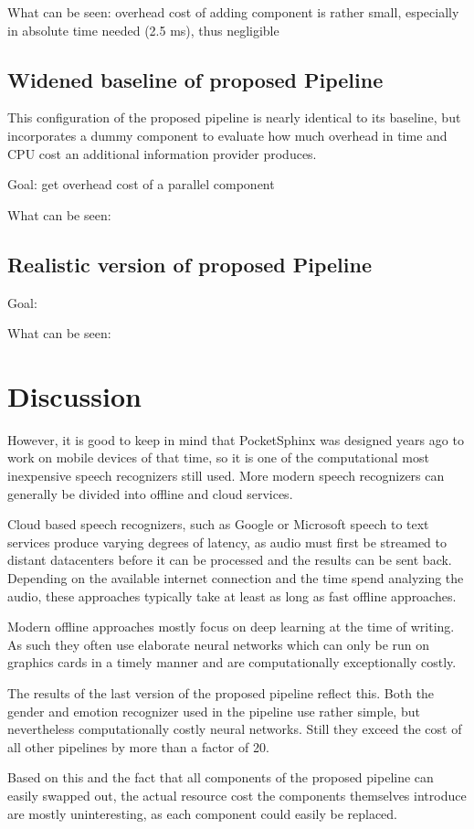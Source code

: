What can be seen: overhead cost of adding component is rather small, especially in absolute time needed (2.5 ms), thus negligible

\subsection{Widened baseline of proposed Pipeline}
This configuration of the proposed pipeline is nearly identical to its baseline, but incorporates a dummy component to evaluate how much overhead in time and CPU cost an additional information provider produces.



Goal: get overhead cost of a parallel component

What can be seen: 

\subsection{Realistic version of proposed Pipeline}


Goal: 

What can be seen: 


\section{Discussion}

However, it is good to keep in mind that PocketSphinx was designed years ago to work on mobile devices of that time, so it is one of the computational most inexpensive speech recognizers still used. 
More modern speech recognizers can generally be divided into offline and cloud services.

Cloud based speech recognizers, such as Google or Microsoft speech to text services produce varying degrees of latency, as audio must first be streamed to distant datacenters before it can be processed and the results can be sent back.
Depending on the available internet connection and the time spend analyzing the audio, these approaches typically take at least as long as fast offline approaches.

Modern offline approaches mostly focus on deep learning at the time of writing. 
As such they often use elaborate neural networks which can only be run on graphics cards in a timely manner and are computationally exceptionally costly.

The results of the last version of the proposed pipeline reflect this.
Both the gender and emotion recognizer used in the pipeline use rather simple, but nevertheless computationally costly neural networks.
Still they exceed the cost of all other pipelines by more than a factor of 20.

Based on this and the fact that all components of the proposed pipeline can easily swapped out, the actual resource cost the components themselves introduce are mostly uninteresting, as each component could easily be replaced.